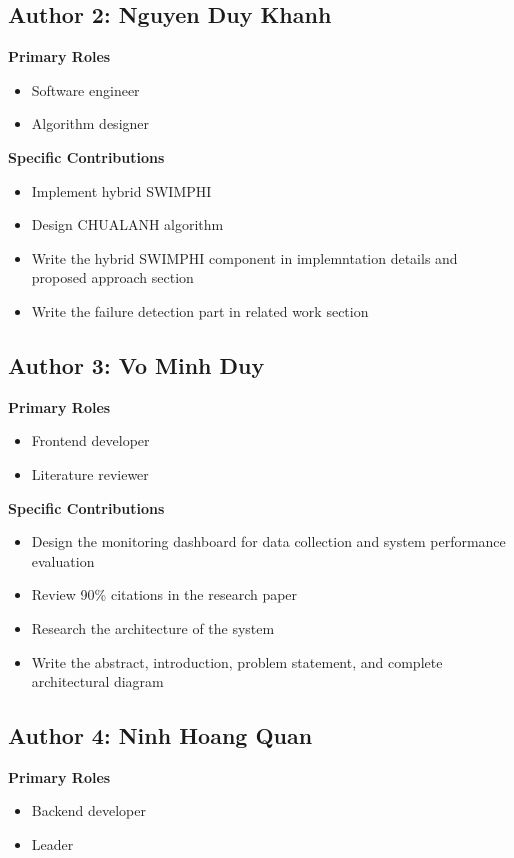 \documentclass[11pt,a4paper]{article}
\begin{document}
\subsection*{Author 2: Nguyen Duy Khanh}

\textbf{Primary Roles}
\begin{itemize}
    \item Software engineer
    \item Algorithm designer
\end{itemize}

\textbf{Specific Contributions}
\begin{itemize}
    \item Implement hybrid SWIMPHI
    \item Design CHUALANH algorithm
    \item Write the hybrid SWIMPHI component in implemntation details and proposed approach section
    \item Write the failure detection part in related work section
\end{itemize}

\subsection*{Author 3: Vo Minh Duy}

\textbf{Primary Roles}
\begin{itemize}
    \item Frontend developer
    \item Literature reviewer
\end{itemize}

\textbf{Specific Contributions}
\begin{itemize}
    \item Design the monitoring dashboard for data collection and system performance evaluation
    \item Review 90\% citations in the research paper
    \item Research the architecture of the system
    \item Write the abstract, introduction, problem statement, and complete architectural diagram
\end{itemize}

\subsection*{Author 4: Ninh Hoang Quan}

\textbf{Primary Roles}
\begin{itemize}
    \item Backend developer
    \item Leader
\end{itemize}
\end{document}
